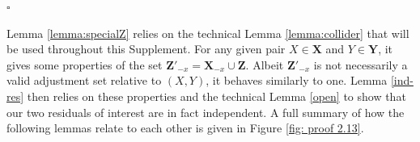 \documentclass[11pt,a4paper]{article}
\theoremstyle{definition}
\theoremstyle{remark}
\newenvironment{proofof}[1][]{\begin{trivlist}
\item[\hskip \labelsep {\textit{Proof of #1.}}]}{\hfill{}$\square$\end{trivlist}}
\newcommand\ci{\protect\mathpalette{\protect\independenT}{\perp}}
\def\independenT#1#2{\mathrel{\rlap{$#1#2$}\mkern2mu{#1#2}}}
\begin{document}
\begin{proofof}[Proposition~\ref{avarDAG}]
	
%	
%	
\end{proofof}


Lemma \ref{lemma:specialZ} relies on the technical Lemma \ref{lemma:collider} that will be used throughout this Supplement. For any given pair $X \in \mathbf{X}$ and $Y \in \mathbf{Y}$, it gives some properties of the set $\mathbf{Z'}_{-x}=\mathbf{X}_{-x} \cup \mathbf{Z}$. Albeit $\mathbf{Z'}_{-x}$ is not necessarily a valid adjustment set relative to $(X,Y)$, it behaves similarly to one. Lemma \ref{ind-res} then relies on these properties and the technical Lemma \ref{open} to show that our two residuals of interest are in fact independent. A full summary of how the following lemmas relate to each other is given in Figure \ref{fig: proof 2.13}. 
\end{document}
